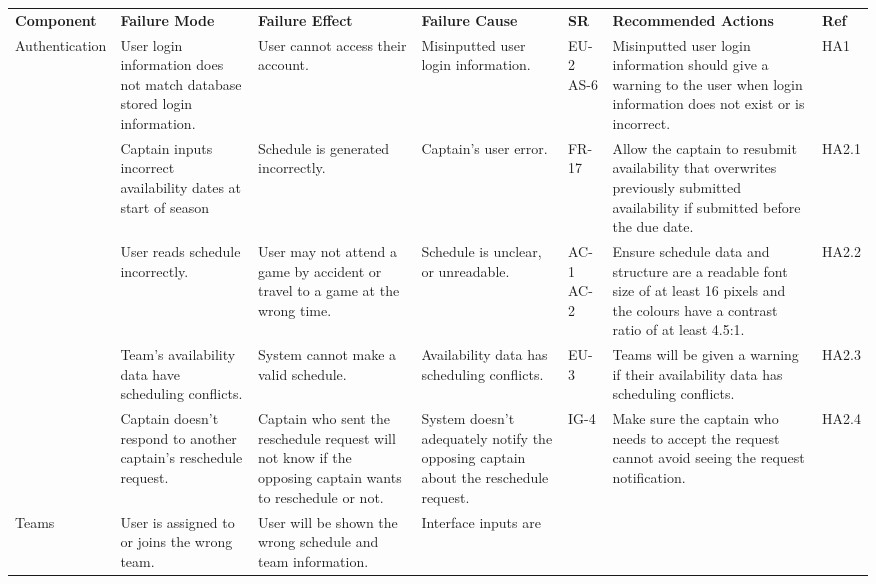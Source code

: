 \documentclass{article}
\begin{document}
\begin{landscape}
\def\arraystretch{1.2}
\begin{tabularx}{504pt}{|p{3cm}||p{4cm}|p{4cm}|p{4cm}|p{1cm}|p{5.75cm}|p{1cm}|}
\cline{1-7}
\textbf{Component} & \textbf{Failure Mode} & \textbf{Failure Effect} & \textbf{Failure Cause} & \textbf{SR} & \textbf{Recommended Actions} & \textbf{Ref} \\
\cline{1-7}
\multirow{2}{2cm}{Authentication} & User login information does not match database stored
login information. & User cannot access their account. & Misinputted user login information.
& EU-2 AS-6 & Misinputted user login information should give a warning to the user when
login information does not exist or is incorrect. & HA1\\
\cline{1-7}
\multirow{2}{2cm}{Scheduling} & Captain inputs incorrect availability dates at
start of season & Schedule is generated incorrectly. & Captain's user error. &
FR-17 & Allow the captain to resubmit availability that overwrites previously
submitted availability if submitted before the due date. & HA2.1\\
\cline{2-7}
& User reads schedule incorrectly. & User may not attend a game by accident or
travel to a game at the wrong time. & Schedule is unclear, or unreadable. & AC-1 AC-2 & Ensure schedule data and structure are a readable
font size of at least 16 pixels and the colours have a contrast ratio of at least
4.5:1. & HA2.2\\
\cline{2-7}
& Team's availability data have scheduling conflicts. & System cannot make a
valid schedule. & Availability data has scheduling conflicts. & EU-3 & Teams
will be given a warning if their availability data has scheduling conflicts. & HA2.3\\
\cline{2-7}
& Captain doesn't respond to another captain's reschedule request. & Captain
who sent the reschedule request will not know if the opposing captain wants to
reschedule or not. & System doesn't adequately notify the opposing captain
about the reschedule request. & IG-4 & Make sure the captain who needs to
accept the request cannot avoid seeing the request notification. & HA2.4\\
\cline{1-7}
\multirow{2}{2cm}{Teams} & User is assigned to or joins the wrong team. & User
will be shown the wrong schedule and team information. & Interface inputs are

\end{tabularx}
\end{landscape}
\end{document}
